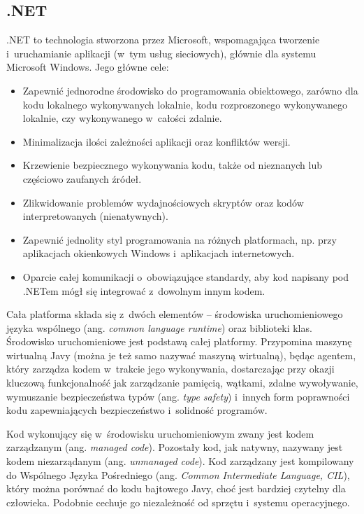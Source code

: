 \subsection{.NET}
.NET to technologia stworzona przez Microsoft, wspomagająca tworzenie i~uruchamianie aplikacji (w~tym usług sieciowych), głównie dla systemu Microsoft Windows\cite{dotnetoverview}. Jego główne cele:
\begin{itemize}
	\item Zapewnić jednorodne środowisko do programowania obiektowego, zarówno dla kodu lokalnego wykonywanych lokalnie, kodu rozproszonego wykonywanego lokalnie, czy wykonywanego w~całości zdalnie.
	\item Minimalizacja ilości zależności aplikacji oraz konfliktów wersji.
	\item Krzewienie bezpiecznego wykonywania kodu, także od nieznanych lub częściowo zaufanych źródeł.
	\item Zlikwidowanie problemów wydajnościowych skryptów oraz kodów interpretowanych (nienatywnych).
	\item Zapewnić jednolity styl programowania na różnych platformach, np. przy aplikacjach okienkowych Windows i~aplikacjach internetowych.
	\item Oparcie całej komunikacji o~obowiązujące standardy, aby kod napisany pod .NETem mógł się integrować z~dowolnym innym kodem.
\end{itemize}

Cała platforma składa się z~dwóch elementów -- środowiska uruchomieniowego języka wspólnego (ang. \emph{common language runtime}) oraz biblioteki klas. Środowisko uruchomieniowe jest podstawą całej platformy. Przypomina maszynę wirtualną Javy (można je też samo nazywać maszyną wirtualną), będąc agentem, który zarządza kodem w~trakcie jego wykonywania, dostarczając przy okazji kluczową funkcjonalność jak zarządzanie pamięcią, wątkami, zdalne wywoływanie, wymuszanie bezpieczeństwa typów (ang. \emph{type safety}) i~innych form poprawności kodu zapewniających bezpieczeństwo i~solidność programów.

Kod wykonujący się w~środowisku uruchomieniowym zwany jest kodem zarządzanym (ang. \emph{managed code}). Pozostały kod, jak natywny, nazywany jest kodem niezarządanym (ang. \emph{unmanaged code}). Kod zarządzany jest kompilowany do Wspólnego Języka Pośredniego\cite{cil} (ang. \emph{Common Intermediate Language, CIL}), który można porównać do kodu bajtowego Javy, choć jest bardziej czytelny dla człowieka. Podobnie cechuje go niezależność od sprzętu i~systemu operacyjnego.

